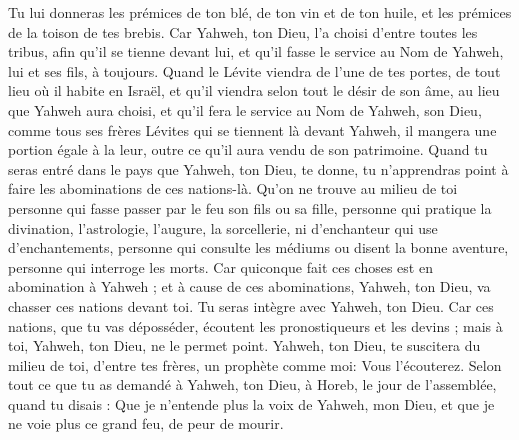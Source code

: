 \begin{multicols}{2}
Tu lui donneras les prémices de ton blé, de ton vin et de ton huile, et les prémices de la toison de tes brebis.
Car Yahweh, ton Dieu, l'a choisi d'entre toutes les tribus, afin qu'il se tienne devant lui, et qu'il fasse le service au Nom de Yahweh, lui et ses fils, à toujours.
Quand le Lévite viendra de l'une de tes portes, de tout lieu où il habite en Israël, et qu'il viendra selon tout le désir de son âme, au lieu que Yahweh aura choisi,
et qu'il fera le service au Nom de Yahweh, son Dieu, comme tous ses frères Lévites qui se tiennent là devant Yahweh,
il mangera une portion égale à la leur, outre ce qu'il aura vendu de son patrimoine.
Quand tu seras entré dans le pays que Yahweh, ton Dieu, te donne, tu n'apprendras point à faire les abominations de ces nations-là.
Qu'on ne trouve au milieu de toi personne qui fasse passer par le feu son fils ou sa fille, personne qui pratique la divination, l'astrologie, l'augure, la sorcellerie,
ni d'enchanteur qui use d'enchantements, personne qui consulte les médiums ou disent la bonne aventure, personne qui interroge les morts.
Car quiconque fait ces choses est en abomination à Yahweh ; et à cause de ces abominations, Yahweh, ton Dieu, va chasser ces nations devant toi.
Tu seras intègre avec Yahweh, ton Dieu.
Car ces nations, que tu vas déposséder, écoutent les pronostiqueurs et les devins ; mais à toi, Yahweh, ton Dieu, ne le permet point.
Yahweh, ton Dieu, te suscitera du milieu de toi, d'entre tes frères, un prophète comme moi: Vous l'écouterez.
Selon tout ce que tu as demandé à Yahweh, ton Dieu, à Horeb, le jour de l'assemblée, quand tu disais : Que je n'entende plus la voix de Yahweh, mon Dieu, et que je ne voie plus ce grand feu, de peur de mourir.

\end{multicols}

